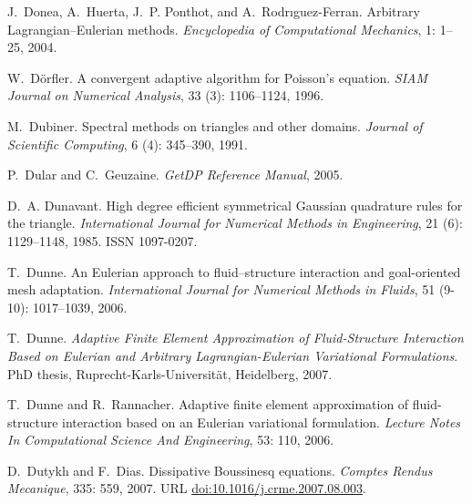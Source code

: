 \begin{thebibliography}{467}
J.~Donea, A.~Huerta, J.~P. Ponthot, and A.~Rodr{\i}guez-Ferran.
\newblock Arbitrary {L}agrangian--{E}ulerian methods.
\newblock \emph{Encyclopedia of Computational Mechanics}, 1: 1--25,
  2004.

W.~D\"{o}rfler.
\newblock A convergent adaptive algorithm for {P}oisson's equation.
\newblock \emph{SIAM Journal on Numerical Analysis}, 33 (3):
  1106--1124, 1996.

M.~Dubiner.
\newblock Spectral methods on triangles and other domains.
\newblock \emph{Journal of Scientific Computing}, 6 (4):
  345--390, 1991.

P.~Dular and C.~Geuzaine.
\newblock \emph{{G}et{DP} Reference Manual}, 2005.

D.~A. Dunavant.
\newblock High degree efficient symmetrical {G}aussian quadrature rules for the
  triangle.
\newblock \emph{International Journal for Numerical Methods in Engineering},
  21 (6): 1129--1148, 1985.
\newblock ISSN 1097-0207.

T.~Dunne.
\newblock An {E}ulerian approach to fluid--structure interaction and
  goal-oriented mesh adaptation.
\newblock \emph{International Journal for Numerical Methods in Fluids},
  51 (9-10): 1017--1039, 2006.

T.~Dunne.
\newblock \emph{Adaptive Finite Element Approximation of Fluid-Structure
  Interaction Based on {E}ulerian and Arbitrary {L}agrangian-{E}ulerian
  Variational Formulations}.
\newblock PhD thesis, Ruprecht-Karls-Universität, Heidelberg, 2007.

T.~Dunne and R.~Rannacher.
\newblock Adaptive finite element approximation of fluid-structure interaction
  based on an {E}ulerian variational formulation.
\newblock \emph{Lecture Notes In Computational Science And Engineering},
  53: 110, 2006.

D.~Dutykh and F.~Dias.
\newblock Dissipative {B}oussinesq equations.
\newblock \emph{Comptes Rendus Mecanique}, 335: 559, 2007.
\newblock URL \url{doi:10.1016/j.crme.2007.08.003}.


\end{thebibliography}
